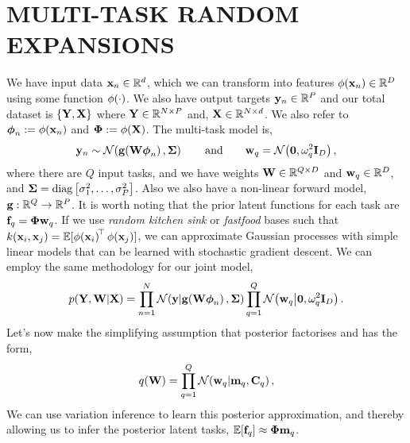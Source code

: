 \section{MULTI-TASK RANDOM EXPANSIONS}
%
We have input data $\mathbf{x}_n \in \mathbb{R}^{d}$, which we can transform into features
$\phi\!\left({{\mathbf{x}_n}}\right) \in \mathbb{R}^{D}$ using some function $\phi\!\left({{\cdot}}\right)$. We also
have output targets $\mathbf{y}_n \in \mathbb{R}^{P}$ and our total dataset is 
$\left\{{\mathbf{Y}, \mathbf{X}}\right\}$ where $\mathbf{Y} \in \mathbb{R}^{N \times P}$ and, $\mathbf{X} \in
\mathbb{R}^{N \times d}$. We also refer to $\boldsymbol\phi_n := \phi\!\left({{\mathbf{x}_n}}\right)$ and
$\boldsymbol\Phi := \phi\!\left({{\mathbf{X}}}\right)$. The multi-task model is,
\begin{equation}
    \mathbf{y}_n \sim \mathcal{N}\!\left({\mathbf{g}\!\left({{\mathbf{W}\boldsymbol\phi_n}}\right), \mathbf{\Sigma}}\right) 
    \qquad \text{and} \qquad
    \mathbf{w}_q = \mathcal{N}\!\left({\mathbf{0}, \omega^2_q \mathbf{I}_{D}}\right),
\end{equation}
where there are $Q$ input tasks, and we have weights $\mathbf{W} \in \mathbb{R}^{Q
    \times D}$ and $\mathbf{w}_q \in \mathbb{R}^{D}$, and $\mathbf{\Sigma} =
\operatorname{diag}{\left[{\sigma^2_1, \ldots, \sigma^2_P}\right]}$. Also we also have a non-linear
forward model, $\mathbf{g} : \mathbb{R}^{Q} \to \mathbb{R}^{P}$. It is worth noting that the
prior latent functions for each task are $\mathbf{f}_q = \boldsymbol\Phi\mathbf{w}_q$. If we
use \emph{random kitchen sink} or \emph{fastfood} bases such that
$k\!\left({{\mathbf{x}_i}, {\mathbf{x}_j}}\right) = 
\mathbb{E}[\phi\!\left({{\mathbf{x}_i}}\right)^{\!\top}\phi\!\left({{\mathbf{x}_j}}\right)]$, we can
approximate Gaussian processes with simple linear models that can
be learned with stochastic gradient descent. We can employ the same methodology
for our joint model,
\begin{equation}
    p\!\left({\mathbf{Y}, \mathbf{W}}\middle\vert{\ensuremath{\mathbf{X}}}\right) =
        \prod^N_{n=1} \mathcal{N}\!\left({\mathbf{y}}\middle\vert{\ensuremath{\mathbf{g}\!\left({{\mathbf{W}\boldsymbol\phi_n}}\right)}, \ensuremath{\mathbf{\Sigma}}}\right)
        \prod^Q_{q=1} \mathcal{N}\!\left({\mathbf{w}_q}\middle\vert{\mathbf{0}, \ensuremath{\omega^2}_q \ensuremath{\mathbf{I}_{D}}}\right).
\end{equation}
Let's now make the simplifying assumption that posterior factorises and has the
form,
\begin{equation}
    q\!\left({\mathbf{W}}\right) = \prod^Q_{q=1} \mathcal{N}\!\left({\mathbf{w}_q}\middle\vert{\ensuremath{\mathbf{m}}_q, \ensuremath{\mathbf{C}}_q}\right),
\end{equation}
We can use variation inference to learn this posterior approximation, and
thereby allowing us to infer the posterior latent tasks,
$\mathbb{E}[\mathbf{f}_q] \approx \boldsymbol\Phi\mathbf{m}_q$.

